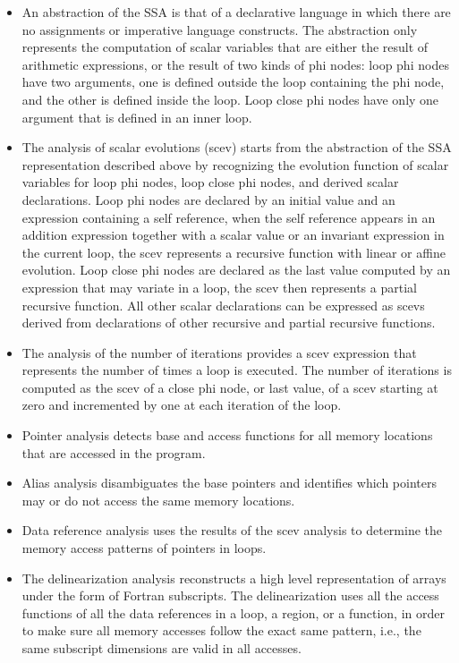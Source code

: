 \documentclass{sigplanconf}
\begin{document}
\begin{itemize}
\item An abstraction of the SSA is that of a declarative language in which there
  are no assignments or imperative language constructs.  The abstraction only
  represents the computation of scalar variables that are either the result of
  arithmetic expressions, or the result of two kinds of phi nodes: loop phi
  nodes have two arguments, one is defined outside the loop containing the phi
  node, and the other is defined inside the loop.  Loop close phi nodes have
  only one argument that is defined in an inner loop.

\item The analysis of scalar evolutions (scev) \cite{scev} starts from the
  abstraction of the SSA representation described above by recognizing the
  evolution function of scalar variables for loop phi nodes, loop close phi
  nodes, and derived scalar declarations.  Loop phi nodes are declared by an
  initial value and an expression containing a self reference, when the self
  reference appears in an addition expression together with a scalar value or an
  invariant expression in the current loop, the scev represents a recursive
  function with linear or affine evolution.  Loop close phi nodes are declared
  as the last value computed by an expression that may variate in a loop, the
  scev then represents a partial recursive function.  All other scalar
  declarations can be expressed as scevs derived from declarations of other
  recursive and partial recursive functions.

\item The analysis of the number of iterations \cite{scev} provides a scev
  expression that represents the number of times a loop is executed.  The number
  of iterations is computed as the scev of a close phi node, or last value, of a
  scev starting at zero and incremented by one at each iteration of the loop.

\item Pointer analysis detects base and access functions for all memory
  locations that are accessed in the program.

\item Alias analysis disambiguates the base pointers and identifies which
  pointers may or do not access the same memory locations.

\item Data reference analysis uses the results of the scev analysis to determine
  the memory access patterns of pointers in loops.

\item The delinearization analysis \cite{delin} reconstructs a high level
  representation of arrays under the form of Fortran subscripts.  The
  delinearization uses all the access functions of all the data references in a
  loop, a region, or a function, in order to make sure all memory accesses
  follow the exact same pattern, i.e., the same subscript dimensions are valid
  in all accesses.
\end{itemize}
\end{document}
